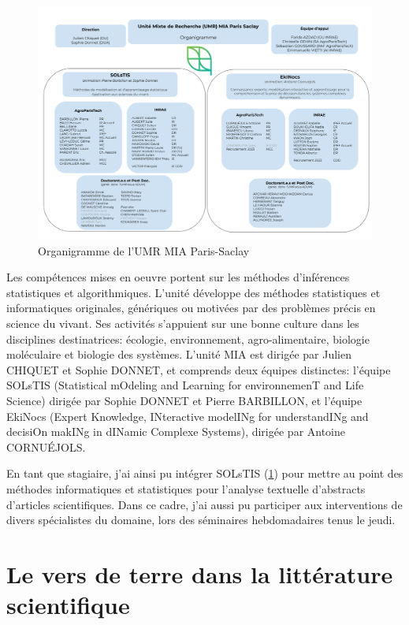 \documentclass{book}
\begin{document}
\begin{figure}[htb] %
    \begin{center} %
        \includegraphics[width=12cm]{organigrammeEquipe.png}
        \caption{Organigramme de l'UMR MIA Paris-Saclay}\label{fig_organigrame}
    \end{center}
\end{figure}
Les compétences mises en oeuvre portent sur les méthodes d’inférences statistiques et algorithmiques. L’unité développe des méthodes statistiques et informatiques originales, \sloppy génériques ou motivées par des problèmes précis en science du vivant. Ses activités s’appuient sur une bonne culture dans les disciplines destinatrices: écologie, environnement, agro-alimentaire, biologie moléculaire et biologie des systèmes.
L'unité MIA est dirigée par Julien CHIQUET et Sophie
DONNET, et comprends deux équipes distinctes: l'équipe SOLsTIS (Statistical
mOdeling and Learning for environnemenT and Life Science) dirigée par Sophie
DONNET et Pierre BARBILLON, et l'équipe EkiNocs (Expert Knowledge, INteractive
modelINg for understandINg and decisiOn makINg in dINamic Complexe Systems),
dirigée par Antoine CORNU\'{E}JOLS.

En tant que stagiaire, j'ai ainsi pu intégrer SOLsTIS (\cref{fig_organigrame}) pour mettre au point des
méthodes informatiques et statistiques pour l'analyse textuelle d'abstracts
d'articles scientifiques. Dans ce cadre, j'ai aussi pu participer aux interventions de divers spécialistes du domaine, lors des séminaires hebdomadaires tenus le jeudi.

\thispagestyle{fancy}

\section{Le vers de terre dans la littérature scientifique}
\end{document}

